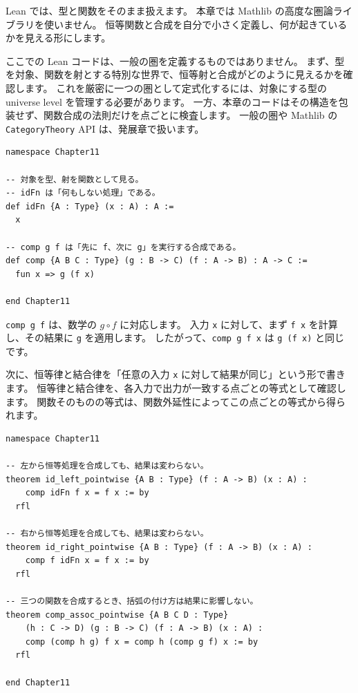 Lean では、型と関数をそのまま扱えます。
本章では Mathlib の高度な圏論ライブラリを使いません。
恒等関数と合成を自分で小さく定義し、何が起きているかを見える形にします。

ここでの Lean コードは、一般の圏を定義するものではありません。
まず、型を対象、関数を射とする特別な世界で、恒等射と合成がどのように見えるかを確認します。
これを厳密に一つの圏として定式化するには、対象にする型の universe level を管理する必要があります。
一方、本章のコードはその構造を包装せず、関数合成の法則だけを点ごとに検査します。
一般の圏や Mathlib の \texttt{CategoryTheory} API は、発展章で扱います。

\begin{listing}[htbp]
\begin{verbatim}
namespace Chapter11

-- 対象を型、射を関数として見る。
-- idFn は「何もしない処理」である。
def idFn {A : Type} (x : A) : A :=
  x

-- comp g f は「先に f、次に g」を実行する合成である。
def comp {A B C : Type} (g : B -> C) (f : A -> B) : A -> C :=
  fun x => g (f x)

end Chapter11
\end{verbatim}
\caption{\texttt{idFn} と \texttt{comp}}
\label{lst:ch11_id_comp}
\end{listing}

\texttt{comp g f} は、数学の \(g \circ f\) に対応します。
入力 \texttt{x} に対して、まず \texttt{f x} を計算し、その結果に \texttt{g} を適用します。
したがって、\texttt{comp g f x} は \texttt{g (f x)} と同じです。

次に、恒等律と結合律を「任意の入力 \texttt{x} に対して結果が同じ」という形で書きます。
恒等律と結合律を、各入力で出力が一致する点ごとの等式として確認します。
関数そのものの等式は、関数外延性によってこの点ごとの等式から得られます。

\begin{listing}[htbp]
\begin{verbatim}
namespace Chapter11

-- 左から恒等処理を合成しても、結果は変わらない。
theorem id_left_pointwise {A B : Type} (f : A -> B) (x : A) :
    comp idFn f x = f x := by
  rfl

-- 右から恒等処理を合成しても、結果は変わらない。
theorem id_right_pointwise {A B : Type} (f : A -> B) (x : A) :
    comp f idFn x = f x := by
  rfl

-- 三つの関数を合成するとき、括弧の付け方は結果に影響しない。
theorem comp_assoc_pointwise {A B C D : Type}
    (h : C -> D) (g : B -> C) (f : A -> B) (x : A) :
    comp (comp h g) f x = comp h (comp g f) x := by
  rfl

end Chapter11
\end{verbatim}
\caption{\texttt{id\_left\_pointwise}・\texttt{id\_right\_pointwise}・\texttt{comp\_assoc\_pointwise}}
\label{lst:ch11_laws}
\end{listing}

